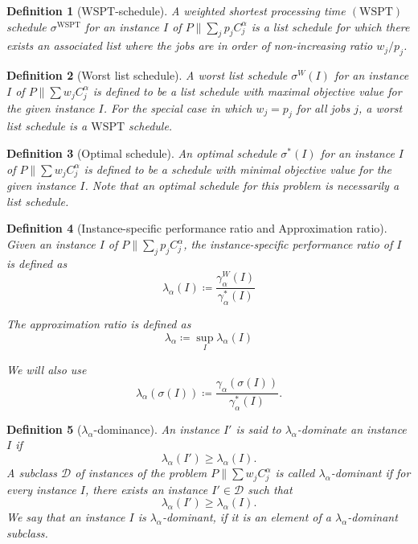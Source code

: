 \documentclass[%
english, titlepage=false %
]{./tum-templates/book/tumbook}
\newtheorem{definition}{Definition}
\newcommand{\Problem}{P\!\parallel\!\sum_j p_j C^{\alpha}_j}
\begin{document}
\begin{definition}[$\mathrm{WSPT}$-schedule]
    A  weighted shortest processing time $(\mathrm{WSPT})$ schedule  $\sigma^{\mathrm{WSPT}}$ for an instance $I$ of $\Problem$ is a list schedule for which there exists
    an associated list where the jobs are in order of non-increasing ratio $w_j / p_j$.
\end{definition}

\begin{definition}[Worst list schedule]
    A worst list schedule $\sigma^{W}(I)$ for an instance $I$ of $P \!\parallel\!\sum w_j C_j^{\alpha}$ is defined to be a list schedule with maximal objective value for the given instance $I$.
    For the special case in which $w_j = p_j$ for all jobs $j$, a worst list schedule is a $\mathrm{WSPT}$ schedule.
\end{definition}

\begin{definition}[Optimal schedule]
    An optimal schedule $\sigma^{*}(I)$ for an instance $I$ of $P \!\parallel\! \sum w_j C_j^{\alpha}$ is defined to be a schedule with minimal objective value for the given instance $I$.
    Note that an optimal schedule for this problem is necessarily a list schedule. 
\end{definition}

\begin{definition}[Instance-specific performance ratio and Approximation ratio]
    Given an instance $I$ of $\Problem$, the instance-specific performance ratio of $I$ is defined as
    \[
        \lambda_{\alpha}(I) \coloneqq \frac{\gamma_{\alpha}^{W}(I)}{\gamma_{\alpha}^{*}(I)} 
    \]

    The approximation ratio is defined as
    \[
        \lambda_{\alpha} \coloneqq \sup_{I} \lambda_{\alpha}(I)
    \]

    We will also use 
    \[
    \lambda_{\alpha}(\sigma(I)) \coloneqq \frac{\gamma_{\alpha}(\sigma(I))}{\gamma_{\alpha}^*(I)}.
    \]
\end{definition}

\begin{definition}[$\lambda_\alpha$-dominance]
An instance \(I'\) is said to \(\lambda_\alpha\)-dominate an instance \(I\) if
\[
    \lambda_\alpha(I') \geq \lambda_\alpha(I).
\]
A subclass \(\mathcal D\) of instances of the problem $P \!\parallel\! \sum w_j C_j^{\alpha}$ is called
\(\lambda_\alpha\)-dominant if for every instance \(I\), there exists
an instance \(I'\in\mathcal D\) such that
\[
    \lambda_\alpha(I') \geq \lambda_\alpha(I).
\]
We say that an instance $I$ is $\lambda_{\alpha}$-dominant, if it is an element of a $\lambda_{\alpha}$-dominant subclass.
\end{definition}
\end{document}
